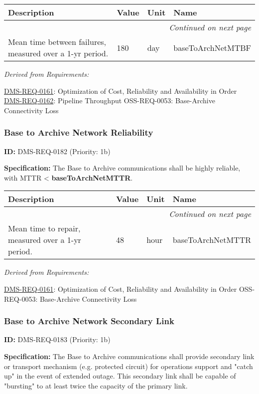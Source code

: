 \documentclass[SE,toc,lsstdraft]{lsstdoc}
\makeatletter
\newcommand{\paramname}[1]{\hspace{0pt}#1}
\newcommand{\unitname}[1]{\hspace{0pt}#1}
\newenvironment{parameters}[0]{%
\setlength\LTleft{0pt}
\setlength\LTright{\fill}
\begin{small}
\begin{longtable}[]{|p{0.49\textwidth}|l|p{0.6in}|p{1.70in}@{}|}

\hline \textbf{Description} & \textbf{Value} & \textbf{Unit} & \textbf{Name} \\ \hline
\endhead

\hline \multicolumn{4}{r}{\emph{Continued on next page}} \\
\endfoot

\hline\hline
\endlastfoot
}{%
\hline
\end{longtable}
\end{small}
}
\makeatother
\begin{document}
\begin{parameters}
Mean time between failures, measured over a 1-yr period.
&
180
&
\unitname{%
day
}
&
\paramname{%
baseToArchNetMTBF
} \\\hline
\end{parameters}

\emph{Derived from Requirements:}

\hyperref[DMS-REQ-0161]{DMS-REQ-0161}:
Optimization of Cost, Reliability and Availability in Order \newline
\hyperref[DMS-REQ-0162]{DMS-REQ-0162}:
Pipeline Throughput \newline
OSS-REQ-0053:
Base-Archive Connectivity Loss \newline

\subsubsection{Base to Archive Network Reliability}

\label{DMS-REQ-0182}
\textbf{ID:} DMS-REQ-0182 (Priority: 1b)

\textbf{Specification:} The Base to Archive communications shall be highly reliable, with MTTR <  \textbf{baseToArchNetMTTR}.

\begin{parameters}
Mean time to repair, measured over a 1-yr period.
&
48
&
\unitname{%
hour
}
&
\paramname{%
baseToArchNetMTTR
} \\\hline
\end{parameters}

\emph{Derived from Requirements:}

\hyperref[DMS-REQ-0161]{DMS-REQ-0161}:
Optimization of Cost, Reliability and Availability in Order \newline
OSS-REQ-0053:
Base-Archive Connectivity Loss \newline

\subsubsection{Base to Archive Network Secondary Link}

\label{DMS-REQ-0183}
\textbf{ID:} DMS-REQ-0183 (Priority: 1b)

\textbf{Specification: }The Base to Archive communications shall provide secondary link or transport mechanism (e.g. protected circuit) for operations support and "catch up"  in the event of extended outage.  This secondary link shall be capable of "bursting" to at least twice the capacity of the primary link.
\end{document}
